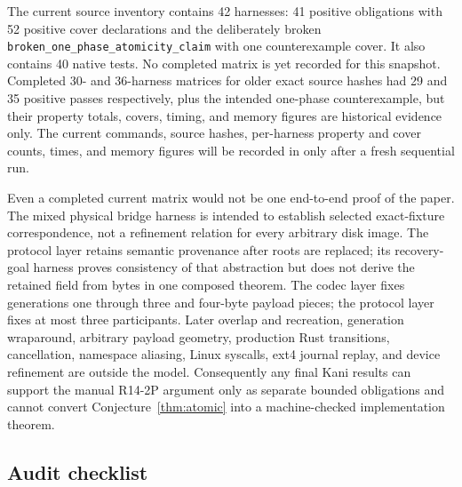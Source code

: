 \documentclass[10pt,twocolumn]{article}
\theoremstyle{remark}
\newcommand{\code}[1]{\texttt{#1}}
\begin{document}
The current source inventory contains 42 harnesses: 41 positive obligations with 52 positive cover
declarations and the deliberately broken \code{broken\_one\_phase\_atomicity\_claim} with one
counterexample cover. It also contains 40 native tests. No completed matrix is yet recorded for
this snapshot. Completed 30- and 36-harness matrices for older exact source hashes had 29 and 35
positive passes respectively, plus the intended one-phase counterexample, but their property
totals, covers, timing, and memory figures are historical evidence only. The current commands,
source hashes, per-harness property and cover counts, times, and memory figures will be recorded in
 only after a fresh sequential run.

Even a completed current matrix would not be one end-to-end proof of the paper. The mixed physical
bridge harness is intended to establish selected exact-fixture correspondence, not a refinement relation for
every arbitrary disk image. The protocol layer retains semantic provenance after roots are replaced; its recovery-goal
harness proves consistency of that abstraction but does not derive the retained field from bytes in
one composed theorem. The codec layer fixes generations one through three and four-byte payload
pieces; the protocol layer fixes at most three participants. Later overlap and recreation,
generation wraparound, arbitrary payload geometry, production Rust transitions, cancellation,
namespace aliasing, Linux syscalls, ext4 journal replay, and device refinement are outside the
model. Consequently any final Kani results can support the manual R14-2P argument only as separate
bounded obligations and cannot convert Conjecture~\ref{thm:atomic} into a machine-checked
implementation theorem.

\subsection{Audit checklist}
\end{document}
